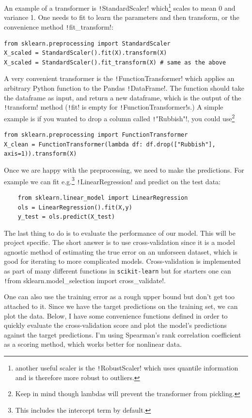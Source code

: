 \documentclass[11pt]{article}
\theoremstyle{definition}
\begin{document}
An example of a transformer is \texttt!StandardScaler! which\footnote{another useful scaler is the \texttt!RobustScaler! which uses quantile information and is therefore more robust to outliers.} scales to mean 0 and variance 1. 
One needs to fit to learn the parameters and then transform, or the convenience method \texttt!fit_transform!:
\begin{verbatim}
from sklearn.preprocessing import StandardScaler
X_scaled = StandardScaler().fit(X).transform(X) 
X_scaled = StandardScaler().fit_transform(X) # same as the above
\end{verbatim}
A very convenient transformer is the \texttt!FunctionTransformer! which applies an arbitrary Python function to the Pandas \texttt!DataFrame!. The function should take the dataframe as input, and return a new dataframe, which is the output of the \texttt!transform! method (\texttt!fit! is empty for \texttt!FunctionTransformer!s.) A simple example is if you wanted to drop a column called \texttt!"Rubbish"!, you could use\footnote{Keep in mind though lambdas will prevent the transformer from pickling.}
\begin{verbatim}
from sklearn.preprocessing import FunctionTransformer
X_clean = FunctionTransformer(lambda df: df.drop(["Rubbish"], axis=1)).transform(X)
\end{verbatim}

Once we are happy with the preprocessing, we need to make the predictions. For example we can fit e.g.\footnote{This includes the intercept term by default.} \texttt!LinearRegression! and predict on the test data:
\begin{verbatim}
    from sklearn.linear_model import LinearRegression
    ols = LinearRegression().fit(X,y)
    y_test = ols.predict(X_test)
\end{verbatim}
The last thing to do is to evaluate the performance of our model. This will be project specific. The short answer is to use cross-validation since it is a model agnostic method of estimating the true error on an unforseen dataset, which is good for iterating to more complicated models. Cross-validation is implemented as part of many different functions in \texttt{scikit-learn} but for starters one can \texttt!from sklearn.model_selection import cross_validate!. 

One can also use the training error as a rough upper bound but don't get too attached to it. Since we have the target predictions on the training set, we can plot the data. Below, I have some convenience functions defined in order to quickly evaluate the cross-validation score and plot the model's predictions against the target predictions. I'm using Spearman's rank correlation coefficient as a scoring method, which works better for nonlinear data.
\end{document}
